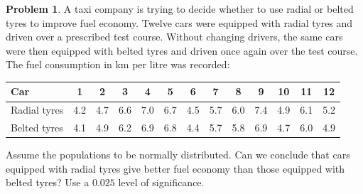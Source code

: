 \documentclass[11pt,a4paper]{article}
\theoremstyle{definition}
\newtheorem{problemx}{Problem}[section]
\newenvironment{problem}{\begin{problemx}}{\end{problemx}}
\begin{document}
\begin{problem}
A taxi company is trying to decide whether to use radial or belted tyres to improve fuel
economy. Twelve cars were equipped with radial tyres and driven over a prescribed test
course. Without changing drivers, the same cars were then equipped with belted tyres and
driven once again over the test course. The fuel consumption in km per litre was recorded:
\begin{table}[H]
\centering
\begin{tabular}{l|cccccccccccc}
Car & 1 & 2 & 3 & 4 & 5 & 6 & 7 & 8 & 9 & 10 & 11 & 12\\
\hline
Radial tyres & 4.2 & 4.7 & 6.6 & 7.0 & 6.7 & 4.5 & 5.7 & 6.0 & 7.4 & 4.9 & 6.1 & 5.2\\
Belted tyres & 4.1 & 4.9 & 6.2 & 6.9 & 6.8 & 4.4 & 5.7 & 5.8 & 6.9 & 4.7 & 6.0 & 4.9\\
\end{tabular}
\end{table}
Assume the populations to be normally distributed. Can we conclude that cars equipped with
radial tyres give better fuel economy than those equipped with belted tyres? Use a $0.025$
level of significance.
\end{problem}
\end{document}

